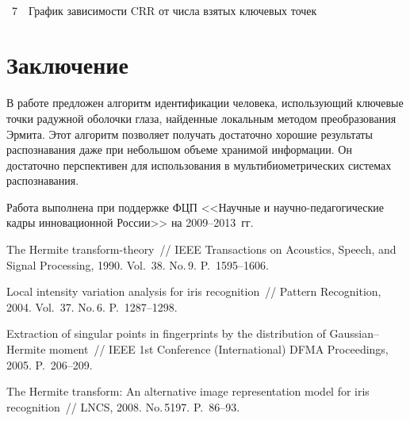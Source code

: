 \begin{multicols}{2}
\addtocounter{table}{1}


\begin{center} %
\vspace*{6pt}
\mbox{%
\epsfxsize=74.136mm 
}
\end{center}
\vspace*{6pt}
{{\figurename~7}\ \ \small{График зависимости CRR от числа взятых ключевых точек}}


\addtocounter{figure}{1}



\section{Заключение}

В работе предложен алгоритм идентификации человека, использующий ключевые точки 
радужной оболочки глаза, найденные локальным методом преобразования Эрмита. Этот 
алгоритм позволяет получать достаточно хорошие результаты распознавания даже при 
небольшом объеме хранимой информации. Он достаточно перспективен для использования в 
мультибиометрических системах распознавания.

\bigskip
Работа выполнена при поддержке ФЦП <<Научные и научно-педагогические кадры 
инновационной России>> на 2009--2013~гг.

{\small\frenchspacing
{%
\begin{thebibliography}{9}

The Hermite transform-theory~// IEEE Transactions on Acoustics, Speech, and Signal Processing, 1990. 
Vol.~38. No.\,9. P.~1595--1606.

Local intensity variation analysis for iris recognition~// Pattern Recognition, 2004. Vol.~37. No.\,6. 
P.~1287--1298.

Extraction of singular points in fingerprints by the distribution of Gaussian--Hermite moment~// IEEE 
1st Conference (International) DFMA Proceedings, 2005. P.~206--209.

The Hermite transform: An alternative image representation model for iris recognition~// LNCS, 2008. 
No.\,5197. P.~86--93.



\end{thebibliography}}}
\end{multicols}
